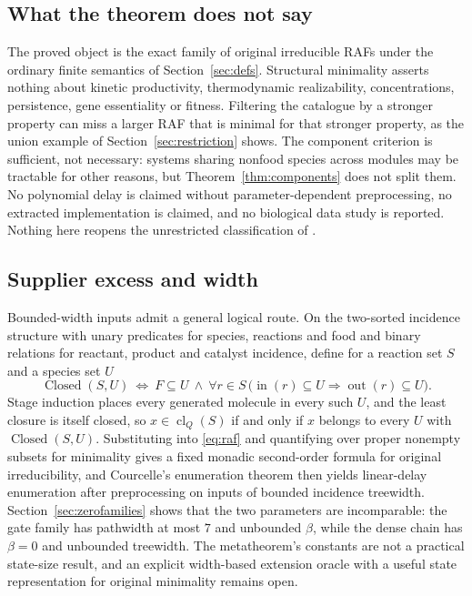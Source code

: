 \documentclass[11pt,a4paper]{article}
\theoremstyle{plain}
\theoremstyle{definition}
\theoremstyle{remark}
\newcommand{\cl}{\operatorname{cl}}
\newcommand{\inp}{\operatorname{in}}
\newcommand{\out}{\operatorname{out}}
\newcommand{\Closed}{\operatorname{Closed}}
\begin{document}
\subsection{What the theorem does not say}

The proved object is the exact family of original irreducible RAFs under the ordinary finite semantics of Section~\ref{sec:defs}. Structural minimality asserts nothing about kinetic productivity, thermodynamic realizability, concentrations, persistence, gene essentiality or fitness. Filtering the catalogue by a stronger property can miss a larger RAF that is minimal for that stronger property, as the union example of Section~\ref{sec:restriction} shows. The component criterion is sufficient, not necessary: systems sharing nonfood species across modules may be tractable for other reasons, but Theorem~\ref{thm:components} does not split them. No polynomial delay is claimed without parameter-dependent preprocessing, no extracted implementation is claimed, and no biological data study is reported. Nothing here reopens the unrestricted classification of \cite{classification2026}.

\subsection{Supplier excess and width}\label{sec:width}

Bounded-width inputs admit a general logical route. On the two-sorted incidence structure with unary predicates for species, reactions and food and binary relations for reactant, product and catalyst incidence, define for a reaction set $S$ and a species set $U$
\[
 \Closed(S,U)\ \Longleftrightarrow\ F\subseteq U\ \wedge\ \forall r\in S\,\bigl(\inp(r)\subseteq U\Rightarrow\out(r)\subseteq U\bigr).
\]
Stage induction places every generated molecule in every such $U$, and the least closure is itself closed, so $x\in\cl_Q(S)$ if and only if $x$ belongs to every $U$ with $\Closed(S,U)$. Substituting into \eqref{eq:raf} and quantifying over proper nonempty subsets for minimality gives a fixed monadic second-order formula for original irreducibility, and Courcelle's enumeration theorem \cite{courcelle1990monadic,courcelle2009linear} then yields linear-delay enumeration after preprocessing on inputs of bounded incidence treewidth. Section~\ref{sec:zerofamilies} shows that the two parameters are incomparable: the gate family has pathwidth at most $7$ and unbounded $\beta$, while the dense chain has $\beta=0$ and unbounded treewidth. The metatheorem's constants are not a practical state-size result, and an explicit width-based extension oracle with a useful state representation for original minimality remains open.
\end{document}
